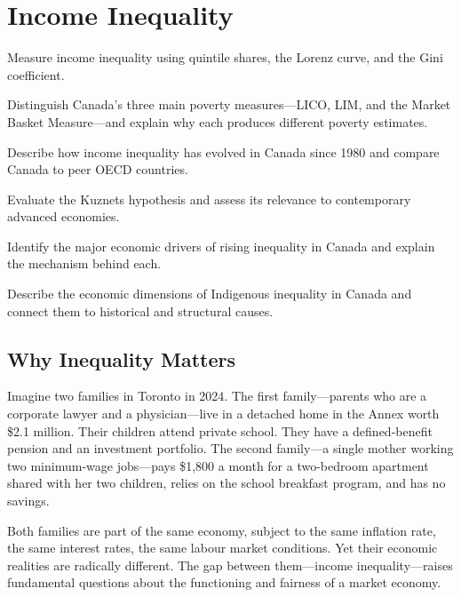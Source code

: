 
\chapter{Income Inequality}
\label{ch:inequality}

\begin{learningobjectives}
\item Measure income inequality using quintile shares, the Lorenz curve, and the Gini coefficient.
\item Distinguish Canada's three main poverty measures---LICO, LIM, and the Market Basket Measure---and explain why each produces different poverty estimates.
\item Describe how income inequality has evolved in Canada since 1980 and compare Canada to peer OECD countries.
\item Evaluate the Kuznets hypothesis and assess its relevance to contemporary advanced economies.
\item Identify the major economic drivers of rising inequality in Canada and explain the mechanism behind each.
\item Describe the economic dimensions of Indigenous inequality in Canada and connect them to historical and structural causes.
\end{learningobjectives}

\section{Why Inequality Matters}

Imagine two families in Toronto in 2024. The first family---parents who are a corporate lawyer and a physician---live in a detached home in the Annex worth \$2.1 million. Their children attend private school. They have a defined-benefit pension and an investment portfolio. The second family---a single mother working two minimum-wage jobs---pays \$1,800 a month for a two-bedroom apartment shared with her two children, relies on the school breakfast program, and has no savings.

Both families are part of the same economy, subject to the same inflation rate, the same interest rates, the same labour market conditions. Yet their economic realities are radically different. The gap between them---income inequality---raises fundamental questions about the functioning and fairness of a market economy.

